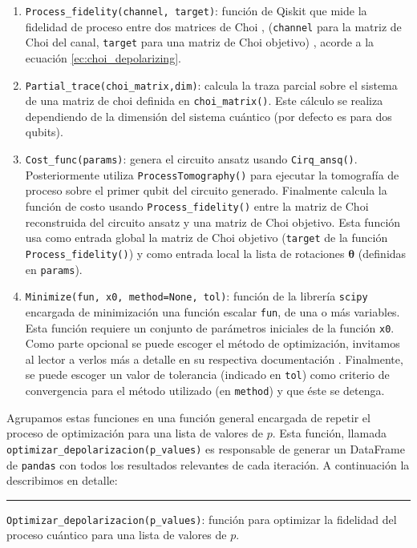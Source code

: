 \documentclass[letterpaper,12pt]{thesisECFM}
\theoremstyle{plain}
\theoremstyle{definition}
\theoremstyle{definition}
\theoremstyle{remark}
\newcommand{\1}{\mathbb{1}}
\begin{document}
\begin{enumerate}
    \item \texttt{Process\_fidelity(channel, target)}: función de Qiskit que
mide la fidelidad de proceso entre dos matrices de Choi , (\texttt{channel}
para la matriz de Choi del canal, \texttt{target} para una matriz de Choi
objetivo) \cite{Qiskit_documentation}, acorde a la ecuación
\ref{ec:choi_depolarizing}.
    \item \texttt{Partial\_trace(choi\_matrix,dim)}: calcula la traza parcial
sobre el sistema de una matriz de choi definida en \texttt{choi\_matrix()}.
Este cálculo se realiza dependiendo de la dimensión del sistema cuántico (por
defecto es para dos qubits).
    \item \texttt{Cost\_func(params)}: genera el circuito ansatz usando
\texttt{Cirq\_ansq()}. Posteriormente utiliza \texttt{ProcessTomography()} para
ejecutar la tomografía de proceso sobre el primer qubit del circuito generado.
Finalmente calcula la función de costo usando \texttt{Process\_fidelity()}
entre la matriz de Choi reconstruida del circuito ansatz y una matriz de Choi
objetivo. Esta función usa como entrada global la matriz de Choi objetivo
(\texttt{target} de la función \texttt{Process\_fidelity()}) y como entrada
local la lista de rotaciones $\bm{\theta}$ (definidas en  \texttt{params}).
    \item \texttt{Minimize(fun, x0, method=None, tol)}: función de la librería
\texttt{scipy} encargada de minimización una función escalar \texttt{fun}, de
una o más variables. Esta función requiere un conjunto de parámetros iniciales
de la función \texttt{x0}. Como parte opcional se puede escoger el método de
optimización, invitamos al lector a verlos más a detalle en su respectiva
documentación \cite{scipy}. Finalmente, se puede escoger un valor de tolerancia
(indicado en \texttt{tol})  como criterio de convergencia para el método
utilizado (en \texttt{method}) y que éste se detenga.
\end{enumerate}

Agrupamos estas funciones en una función general encargada de repetir el
proceso de optimización para una lista de valores de $p$. Esta función, llamada
\texttt{optimizar\_depolarizacion(p\_values)} es responsable de generar un
DataFrame de \texttt{pandas} con todos los resultados relevantes de cada
iteración. A continuación la describimos en detalle:

\noindent\rule{\textwidth}{1mm}
\texttt{Optimizar\_depolarizacion(p\_values)}: función para optimizar la
fidelidad del proceso cuántico para una lista de valores de $p$. \newline
\end{document}
